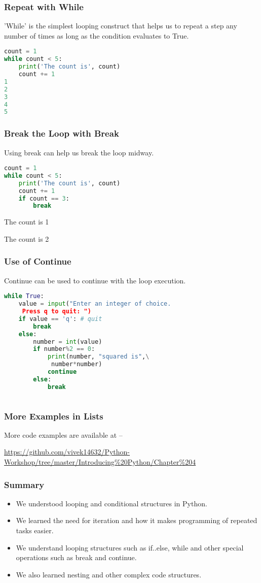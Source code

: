 \documentclass{beamer}
\begin{document}
\begin{frame}[fragile]
\frametitle{Repeat with While}
'While' is the simplest looping construct that helps us to repeat a step any number of times as long as the condition evaluates to True.
\begin{lstlisting}[language=Python]
count = 1
while count < 5:
    print('The count is', count)
    count += 1
1
2
3
4
5
\end{lstlisting}
\end{frame}

\begin{frame}[fragile]
\frametitle{Break the Loop with Break}
Using break can help us break the loop midway.
\begin{lstlisting}[language=Python]
count = 1
while count < 5:
    print('The count is', count)
    count += 1
    if count == 3:
    	break
\end{lstlisting}
The count is 1

The count is 2
\end{frame}

\begin{frame}[fragile]
\frametitle{Use of Continue}
Continue can be used to continue with the loop execution.
\begin{lstlisting}[language=Python]
while True:
    value = input("Enter an integer of choice.
     Press q to quit: ")
    if value == 'q': # quit
        break
    else:
        number = int(value)
        if number%2 == 0:
            print(number, "squared is",\
             number*number)
            continue
        else:
            break
        
\end{lstlisting}
\end{frame}

\begin{frame}
\frametitle{More Examples in Lists}
More code examples are available at --
 
\url{https://github.com/vivek14632/Python-Workshop/tree/master/Introducing\%20Python/Chapter\%204}
\end{frame}

\begin{frame}
\frametitle{Summary}
\begin{itemize}
\item We understood looping and conditional structures in Python.
\item We learned the need for iteration and how it makes programming of repeated tasks easier.
\item We understand looping structures such as if..else, while and other special operations such as break and continue.
\item We also learned nesting and other complex code structures.
\end{itemize}
\end{frame}
\end{document}
